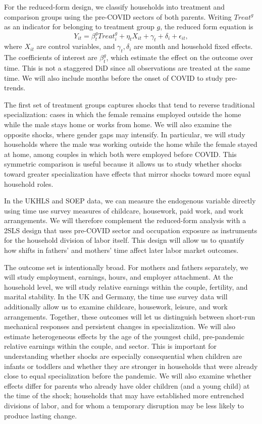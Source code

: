 \documentclass[12pt]{article}
\begin{document}
For the reduced-form design, we classify households into treatment and comparison groups using the pre-COVID sectors of both parents. Writing $Treat^g$ as an indicator for belonging to treatment group $g$, the reduced form equation is
\begin{equation} \label{eq:simple_DID}
Y_{it}=\beta^g_{t}Treat^g_i+\eta_t X_{it}+\gamma_t+\delta_i+\epsilon_{it},
\end{equation}
where $X_{it}$ are control variables, and $\gamma_t,\delta_i$ are month and household fixed effects. The coefficients of interest are $\beta_{t}^g$, which estimate the effect on the outcome over time. This is not a staggered DiD since all observations are treated at the same time. We will also include months before the onset of COVID to study pre-trends.

The first set of treatment groups captures shocks that tend to reverse traditional specialization: cases in which the female remains employed outside the home while the male stays home or works from home. We will also examine the opposite shocks, where gender gaps may intensify. In particular, we will study households where the male was working outside the home while the female stayed at home, among couples in which both were employed before COVID. This symmetric comparison is useful because it allows us to study whether shocks toward greater specialization have effects that mirror shocks toward more equal household roles.

In the UKHLS and SOEP data, we can measure the endogenous variable directly using time use survey measures of childcare, housework, paid work, and work arrangements. We will therefore complement the reduced-form analysis with a 2SLS design that uses pre-COVID sector and occupation exposure as instruments for the household division of labor itself. This design will allow us to quantify how shifts in fathers' and mothers' time affect later labor market outcomes.

The outcome set is intentionally broad. For mothers and fathers separately, we will study employment, earnings, hours, and employer attachment. At the household level, we will study relative earnings within the couple, fertility, and marital stability. In the UK and Germany, the time use survey data will additionally allow us to examine childcare, housework, leisure, and work arrangements. Together, these outcomes will let us distinguish between short-run mechanical responses and persistent changes in specialization. We will also estimate heterogeneous effects by the age of the youngest child, pre-pandemic relative earnings within the couple, and sector. This is important for understanding whether shocks are especially consequential when children are infants or toddlers and whether they are stronger in households that were already close to equal specialization before the pandemic. We will also examine whether effects differ for parents who already have older children (and a young child) at the time of the shock; households that may have established more entrenched divisions of labor, and for whom a temporary disruption may be less likely to produce lasting change.
\end{document}
